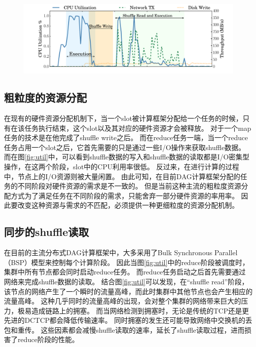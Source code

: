 \begin{figure}[!htp]
	\centering
	\includegraphics[width=\textwidth]{../../PPoPP-2018/fig/util.pdf}
\end{figure}

\subsection{粗粒度的资源分配}

在现有的硬件资源分配机制下，当一个slot被计算框架分配给一个任务的时候，只有在该任务执行结束，这个slot以及其对应的硬件资源才会被释放。
对于一个map任务的技术是在他完成了shuffle write之后。
而在reduce任务一端，当一个reduce任务占用一个slot之后，它首先需要的只是通过一些I/O操作来获取shuffle数据。
而在图\ref{fig:util}中，可以看到shuffle数据的写入和shuffle数据的读取都是I/O密集型操作，在这两个阶段，slot中的CPU利用率很低。
反过来，在进行计算的过程中，节点上的I/O资源则被大量闲置。
由此可知，在目前DAG计算框架分配的任务的不同阶段对硬件资源的需求是不一致的。
但是当前这种主流的粗粒度资源分配方式为了满足任务在不同阶段的需求，只能舍弃一部分硬件资源的率用率。
因此要改变这种资源与需求的不匹配，必须提供一种更细粒度的资源分配机制。

\subsection{同步的shuffle读取}

在目前的主流分布式DAG计算框架中，大多采用了Bulk Synchronous Parallel（BSP）模型来控制每个计算阶段。
因此当图\ref{fig:util}中的reduce阶段被调度时，集群中所有节点都会同时启动reduce任务。
而reduce任务启动之后首先需要通过网络来完成shuffle数据的读取。
结合图\ref{fig:util}可以发现，在“shuffle read”阶段，该节点的网络产生了一个瞬时的流量高峰，而此时集群中其他节点也会产生相应的流量高峰。
这种几乎同时的流量高峰的出现，会对整个集群的网络带来巨大的压力，极易造成链路上的拥塞。
而当网络检测到拥塞时，无论是传统的TCP\cite{tcp}还是更先进的DCTCP\cite{dctcp}都会降低传输速率。
同时拥塞的发生还可能导致网络中交换机的丢包和重传。
这些因素都会减慢shuffle读取的速率，延长了shuffle读取过程，进而损害了reduce阶段的性能。

